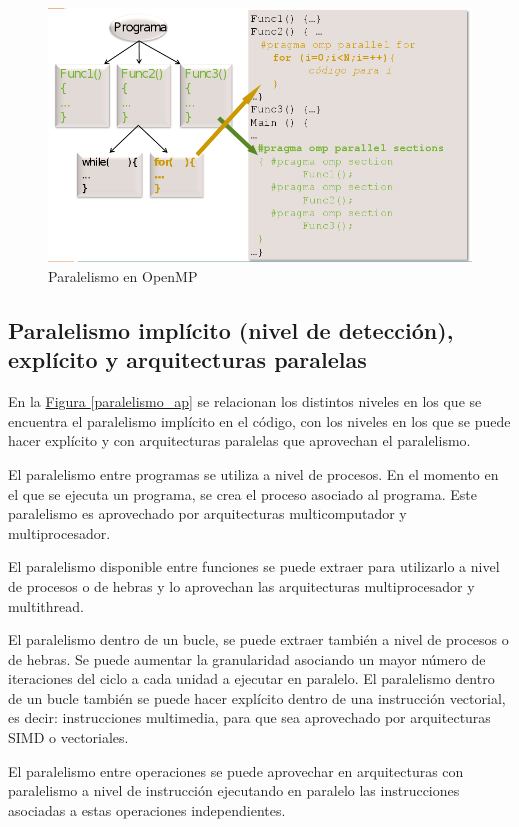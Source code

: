 \documentclass[10pt,a4paper,spanish]{report}
\begin{document}
\begin{figure}[!h]
\centering
\includegraphics[width=1\textwidth]{3}
\caption{Paralelismo en OpenMP}
\label{paralelismo_openmp}
\end{figure}

\newpage
\textcolor[rgb]{0.2,0.4,0.8}{\subsection{Paralelismo implícito (nivel de detección), explícito y arquitecturas paralelas}}
En la \hyperref[paralelismo_ap]{Figura \ref*{paralelismo_ap}} se relacionan los distintos niveles en los que se encuentra el paralelismo implícito en el código, con los niveles en los que se puede hacer explícito y con arquitecturas paralelas que aprovechan el paralelismo.

El paralelismo entre programas se utiliza a nivel de procesos. En el momento en el que se ejecuta un programa, se crea el proceso asociado al programa. Este paralelismo es aprovechado por arquitecturas multicomputador y multiprocesador.

El paralelismo disponible entre funciones se puede extraer para utilizarlo a nivel de procesos o de hebras y lo aprovechan las arquitecturas multiprocesador y multithread.

El paralelismo dentro de un bucle, se puede extraer también a nivel de procesos o de hebras. Se puede aumentar la granularidad asociando un mayor número de iteraciones del ciclo a cada unidad a ejecutar en paralelo. El paralelismo dentro de un bucle también se puede hacer explícito dentro de una instrucción vectorial, es decir: instrucciones multimedia, para que sea aprovechado por arquitecturas SIMD o vectoriales.

El paralelismo entre operaciones se puede aprovechar en arquitecturas con paralelismo a nivel de instrucción ejecutando en paralelo las instrucciones asociadas a estas operaciones independientes.
\end{document}
